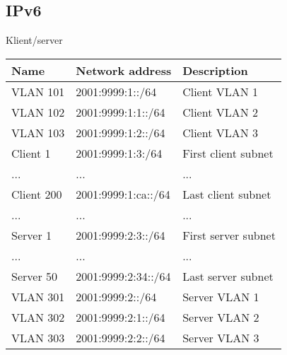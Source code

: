 \documentclass[czech,master,dept460,male,cpp,cpdeclaration]{diploma}
\begin{document}
\subsection{IPv6}
\label{subsec:Sec042}
\noindent Klient/server
\begin{center}
	\begin{tabular}{l|l|l}
		Name & Network address & Description \\
		\hline
		VLAN 101 & 2001:9999:1::/64 & Client VLAN 1\\
		VLAN 102 & 2001:9999:1:1::/64 & Client VLAN 2\\
		VLAN 103 & 2001:9999:1:2::/64 & Client VLAN 3\\
		Client 1 & 2001:9999:1:3:/64 & First client subnet\\
		... & ... & ...\\
		Client 200 & 2001:9999:1:ca::/64 & Last client subnet\\
		... & ... & ...\\
		Server 1 & 2001:9999:2:3::/64 & First server subnet\\
		... & ... & ...\\
		Server 50 & 2001:9999:2:34::/64 & Last server subnet\\
		VLAN 301 & 2001:9999:2::/64 & Server VLAN 1\\
		VLAN 302 & 2001:9999:2:1::/64 & Server VLAN 2\\
		VLAN 303 & 2001:9999:2:2::/64 & Server VLAN 3\\
	\end{tabular}
\end{center}
\end{document}
